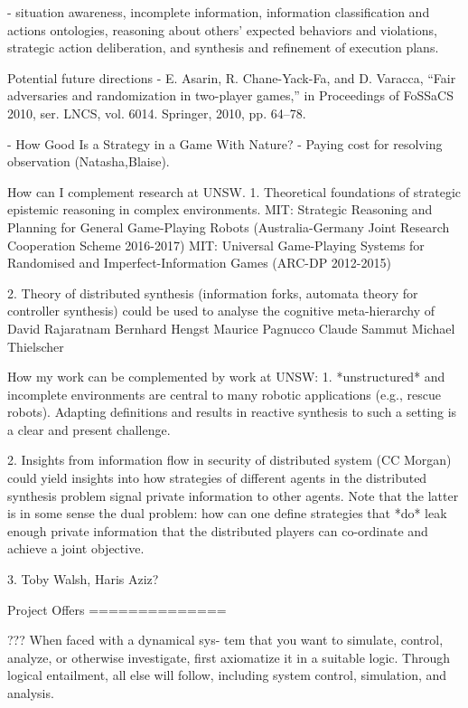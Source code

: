 \documentclass[10pt,a4paper,sans]{moderncv}
\begin{document}
- situation awareness, incomplete information,
information classification and actions ontologies, reasoning about others’ expected behaviors and violations,
strategic action deliberation, and synthesis and refinement of execution plans.

Potential future directions
- E. Asarin, R. Chane-Yack-Fa, and D. Varacca, “Fair adversaries and
randomization in two-player games,” in Proceedings of FoSSaCS 2010,
ser. LNCS, vol. 6014. Springer, 2010, pp. 64–78.

- How Good Is a Strategy in a Game With Nature?
- Paying cost for resolving observation (Natasha,Blaise).

How can I complement research at UNSW.
1. Theoretical foundations of strategic epistemic reasoning in complex environments.
MIT: Strategic Reasoning and Planning for General Game-Playing Robots (Australia-Germany Joint Research Cooperation Scheme 2016-2017)
MIT: Universal Game-Playing Systems for Randomised and Imperfect-Information Games (ARC-DP 2012-2015)

2. Theory of distributed synthesis (information forks, automata theory for controller synthesis) 
could be used to analyse the cognitive meta-hierarchy of 
David Rajaratnam
Bernhard Hengst
Maurice Pagnucco
Claude Sammut
Michael Thielscher



How my work can be complemented by work at UNSW:
1. *unstructured* and incomplete environments are central to many robotic applications (e.g., rescue robots). Adapting definitions and results in reactive synthesis to such a setting is a clear and present challenge.

2. Insights from information flow in security of distributed system (CC Morgan) could yield insights into how strategies of different agents in the distributed synthesis problem signal private information to other agents. Note that the latter is in some sense the dual problem: how can one define strategies that *do* leak enough private information that the distributed players can co-ordinate and achieve a joint objective.

3. Toby Walsh, Haris Aziz?



Project Offers
==============



???
When faced with a dynamical sys-
tem that you want to simulate, control, analyze, or otherwise investigate, first axiomatize
it in a suitable logic. Through logical entailment, all else will follow, including system
control, simulation, and analysis.
\end{document}
